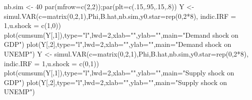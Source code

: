 \documentclass[
  12pt,
]{book}
\newenvironment{Shaded}{\begin{snugshade}}{\end{snugshade}}
\newcommand{\AttributeTok}[1]{\textcolor[rgb]{0.77,0.63,0.00}{#1}}
\newcommand{\DecValTok}[1]{\textcolor[rgb]{0.00,0.00,0.81}{#1}}
\newcommand{\FunctionTok}[1]{\textcolor[rgb]{0.00,0.00,0.00}{#1}}
\newcommand{\NormalTok}[1]{#1}
\newcommand{\OtherTok}[1]{\textcolor[rgb]{0.56,0.35,0.01}{#1}}
\newcommand{\SpecialCharTok}[1]{\textcolor[rgb]{0.00,0.00,0.00}{#1}}
\newcommand{\StringTok}[1]{\textcolor[rgb]{0.31,0.60,0.02}{#1}}
\theoremstyle{definition}
\theoremstyle{definition}
\theoremstyle{definition}
\theoremstyle{definition}
\theoremstyle{remark}
\begin{document}
\begin{Shaded}
\begin{Highlighting}[]
\NormalTok{nb.sim }\OtherTok{\textless{}{-}} \DecValTok{40}
\FunctionTok{par}\NormalTok{(}\AttributeTok{mfrow=}\FunctionTok{c}\NormalTok{(}\DecValTok{2}\NormalTok{,}\DecValTok{2}\NormalTok{));}\FunctionTok{par}\NormalTok{(}\AttributeTok{plt=}\FunctionTok{c}\NormalTok{(.}\DecValTok{15}\NormalTok{,.}\DecValTok{95}\NormalTok{,.}\DecValTok{15}\NormalTok{,.}\DecValTok{8}\NormalTok{))}
\NormalTok{Y }\OtherTok{\textless{}{-}} \FunctionTok{simul.VAR}\NormalTok{(}\AttributeTok{c=}\FunctionTok{matrix}\NormalTok{(}\DecValTok{0}\NormalTok{,}\DecValTok{2}\NormalTok{,}\DecValTok{1}\NormalTok{),Phi,B.hat,nb.sim,}\AttributeTok{y0.star=}\FunctionTok{rep}\NormalTok{(}\DecValTok{0}\NormalTok{,}\DecValTok{2}\SpecialCharTok{*}\DecValTok{8}\NormalTok{),}
               \AttributeTok{indic.IRF =} \DecValTok{1}\NormalTok{,}\AttributeTok{u.shock =} \FunctionTok{c}\NormalTok{(}\DecValTok{1}\NormalTok{,}\DecValTok{0}\NormalTok{))}
\FunctionTok{plot}\NormalTok{(}\FunctionTok{cumsum}\NormalTok{(Y[,}\DecValTok{1}\NormalTok{]),}\AttributeTok{type=}\StringTok{"l"}\NormalTok{,}\AttributeTok{lwd=}\DecValTok{2}\NormalTok{,}\AttributeTok{xlab=}\StringTok{""}\NormalTok{,}\AttributeTok{ylab=}\StringTok{""}\NormalTok{,}\AttributeTok{main=}\StringTok{"Demand shock on GDP"}\NormalTok{)}
\FunctionTok{plot}\NormalTok{(Y[,}\DecValTok{2}\NormalTok{],}\AttributeTok{type=}\StringTok{"l"}\NormalTok{,}\AttributeTok{lwd=}\DecValTok{2}\NormalTok{,}\AttributeTok{xlab=}\StringTok{""}\NormalTok{,}\AttributeTok{ylab=}\StringTok{""}\NormalTok{,}\AttributeTok{main=}\StringTok{"Demand shock on UNEMP"}\NormalTok{)}
\NormalTok{Y }\OtherTok{\textless{}{-}} \FunctionTok{simul.VAR}\NormalTok{(}\AttributeTok{c=}\FunctionTok{matrix}\NormalTok{(}\DecValTok{0}\NormalTok{,}\DecValTok{2}\NormalTok{,}\DecValTok{1}\NormalTok{),Phi,B.hat,nb.sim,}\AttributeTok{y0.star=}\FunctionTok{rep}\NormalTok{(}\DecValTok{0}\NormalTok{,}\DecValTok{2}\SpecialCharTok{*}\DecValTok{8}\NormalTok{),}
               \AttributeTok{indic.IRF =} \DecValTok{1}\NormalTok{,}\AttributeTok{u.shock =} \FunctionTok{c}\NormalTok{(}\DecValTok{0}\NormalTok{,}\DecValTok{1}\NormalTok{))}
\FunctionTok{plot}\NormalTok{(}\FunctionTok{cumsum}\NormalTok{(Y[,}\DecValTok{1}\NormalTok{]),}\AttributeTok{type=}\StringTok{"l"}\NormalTok{,}\AttributeTok{lwd=}\DecValTok{2}\NormalTok{,}\AttributeTok{xlab=}\StringTok{""}\NormalTok{,}\AttributeTok{ylab=}\StringTok{""}\NormalTok{,}\AttributeTok{main=}\StringTok{"Supply shock on GDP"}\NormalTok{)}
\FunctionTok{plot}\NormalTok{(Y[,}\DecValTok{2}\NormalTok{],}\AttributeTok{type=}\StringTok{"l"}\NormalTok{,}\AttributeTok{lwd=}\DecValTok{2}\NormalTok{,}\AttributeTok{xlab=}\StringTok{""}\NormalTok{,}\AttributeTok{ylab=}\StringTok{""}\NormalTok{,}\AttributeTok{main=}\StringTok{"Supply shock on UNEMP"}\NormalTok{)}
\end{Highlighting}
\end{Shaded}
\end{document}
